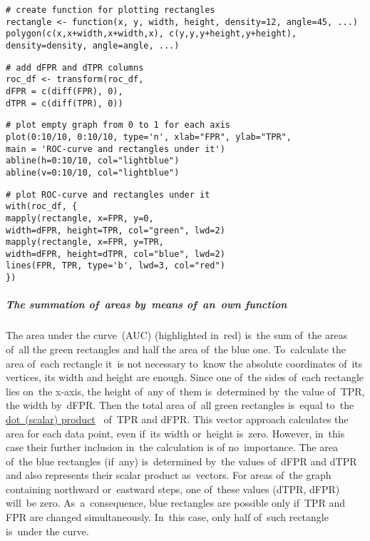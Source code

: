 \documentclass[]{scrreprt}
\begin{document}
%
\begin{lstlisting}[float=htp, caption = Create the \textbf{rectangle} function, firstnumber=1, label= lst:create-rectangle-function-r]
# create function for plotting rectangles
rectangle <- function(x, y, width, height, density=12, angle=45, ...) 
polygon(c(x,x+width,x+width,x), c(y,y,y+height,y+height), 
density=density, angle=angle, ...)
\end{lstlisting}
%
\begin{lstlisting}[float=htp, caption = Adding \textit{dFPR} and \textit{dTPR} columns, firstnumber=1, label= lst:add-dFPR&dTPR-columns-r]
# add dFPR and dTPR columns
roc_df <- transform(roc_df, 
dFPR = c(diff(FPR), 0),
dTPR = c(diff(TPR), 0))
\end{lstlisting}
%
\begin{lstlisting}[float=htp, caption = Drawing an~empty graph and marking axes from~0 to~1, firstnumber=1, label= lst:plot-empty-graph-from-0-to-1-r]
# plot empty graph from 0 to 1 for each axis
plot(0:10/10, 0:10/10, type='n', xlab="FPR", ylab="TPR",
main = 'ROC-curve and rectangles under it')
abline(h=0:10/10, col="lightblue")
abline(v=0:10/10, col="lightblue")
\end{lstlisting}
%
\begin{lstlisting}[float=htp, caption = Construction of~ROC curve and rectangles under~it, firstnumber=1, label= lst:plot-ROC-curve-and-rectangles-under-it-r]
# plot ROC-curve and rectangles under it
with(roc_df, {
mapply(rectangle, x=FPR, y=0,   
width=dFPR, height=TPR, col="green", lwd=2)
mapply(rectangle, x=FPR, y=TPR, 
width=dFPR, height=dTPR, col="blue", lwd=2)
lines(FPR, TPR, type='b', lwd=3, col="red")
})
\end{lstlisting}

\subparagraph{The summation of~areas by~means of~an~own function}
The area under the curve~(AUC) (highlighted in~red) is~the sum of~the areas of~all the green rectangles and half the area of~the blue one. To~calculate the area of~each rectangle it~is not necessary to~know the absolute coordinates of~its vertices, its width and height are enough. Since one of~the sides of~each rectangle lies on~the x-axis, the height of~any of~them is~determined by~the value of~TPR, the width by~dFPR. Then the total area of~all green rectangles is~equal to~the \href{https://en.wikipedia.org/wiki/Dot_product}{dot~(scalar) product}~\cite{Wiki:dot-product} of~TPR and dFPR. This vector approach calculates the area for each data point, even if~its width or~height is~zero. However, in~this case their further inclusion in~the calculation is of no~importance. The area of~the blue rectangles (if~any) is~determined by~the values of~dFPR and dTPR and also represents their scalar product as~vectors. For areas of~the graph containing northward or~eastward steps, one of~these values (dTPR, dFPR) will~be zero. As~a~consequence, blue rectangles are possible only if~TPR and FPR are changed simultaneously. In~this case, only half of~such rectangle is~under the curve.
\end{document}
